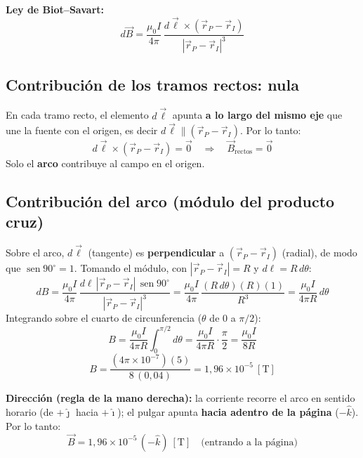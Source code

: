 \documentclass[12pt,letterpaper]{article}
\begin{document}
\medskip

\noindent\textbf{Ley de Biot--Savart:}
\[
    d\vec{B} = \frac{\mu_0 I}{4\pi}\,\frac{d\vec{\ell}\times(\vec{r}_{P}-\vec{r}_{I})}{|\vec{r}_{P}-\vec{r}_{I}|^3}
\]

\subsection*{Contribuci\'on de los tramos rectos: nula}
En cada tramo recto, el elemento $d\vec{\ell}$ apunta \textbf{a lo largo del mismo eje} que une la
fuente con el origen, es decir $d\vec{\ell} \parallel (\vec{r}_{P}-\vec{r}_{I})$. Por lo tanto:
\[
    d\vec{\ell}\times(\vec{r}_{P}-\vec{r}_{I}) = \vec{0}
    \quad\Longrightarrow\quad
    \vec{B}_{\text{rectos}} = \vec{0}
\]
Solo el \textbf{arco} contribuye al campo en el origen.

\subsection*{Contribuci\'on del arco (m\'odulo del producto cruz)}
Sobre el arco, $d\vec{\ell}$ (tangente) es \textbf{perpendicular} a $(\vec{r}_{P}-\vec{r}_{I})$
(radial), de modo que $\operatorname{sen}90^\circ = 1$. Tomando el m\'odulo, con
$|\vec{r}_{P}-\vec{r}_{I}| = R$ y $d\ell = R\,d\theta$:
\[
    dB = \frac{\mu_0 I}{4\pi}\,\frac{d\ell\,|\vec{r}_{P}-\vec{r}_{I}|\,\operatorname{sen}90^\circ}{|\vec{r}_{P}-\vec{r}_{I}|^3}
       = \frac{\mu_0 I}{4\pi}\,\frac{(R\,d\theta)(R)(1)}{R^3}
       = \frac{\mu_0 I}{4\pi R}\,d\theta
\]
Integrando sobre el cuarto de circunferencia ($\theta$ de $0$ a $\pi/2$):
\[
    B = \frac{\mu_0 I}{4\pi R}\int_{0}^{\pi/2} d\theta
      = \frac{\mu_0 I}{4\pi R}\cdot\frac{\pi}{2}
      = \frac{\mu_0 I}{8R}
\]
\[
    B = \frac{(4\pi\times10^{-7})(5)}{8\,(0{,}04)} = 1{,}96\times10^{-5}\ [\text{T}]
\]

\noindent\textbf{Direcci\'on (regla de la mano derecha):} la corriente recorre el arco en sentido
horario (de $+\hat{\jmath}$ hacia $+\hat{\imath}$); el pulgar apunta \textbf{hacia adentro de la
p\'agina} ($-\hat{k}$). Por lo tanto:
\[
    \boxed{\vec{B} = 1{,}96\times10^{-5}\,(-\hat{k})\ [\text{T}]\quad\text{(entrando a la p\'agina)}}
\]
\end{document}
